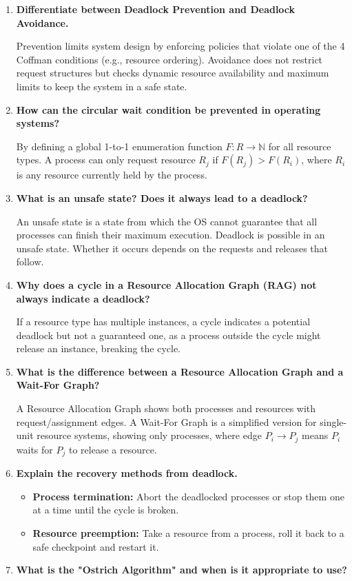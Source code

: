 \documentclass[12pt,a4paper]{article}
\newcommand{\Q}[1]{\textbf{#1}\par\noindent\ignorespaces}
\begin{document}
\begin{tcolorbox}[exambox, title={\textbf{Frequently Asked / Viva Questions}}]
\begin{enumerate}[topsep=0pt, label=\textbf{Q\arabic*.}, itemsep=5pt]
\begin{itemize}[leftmargin=*, itemsep=2.5pt, topsep=2pt]
    \end{itemize}
    \textbf{Result:} All processes finished. System is in \textbf{safe state} with safe sequence: $\langle \mathbf{P1, P3, P0, P2, P4} \rangle$.
  \item \Q{Differentiate between Deadlock Prevention and Deadlock Avoidance.}
    Prevention limits system design by enforcing policies that violate one of the 4 Coffman conditions (e.g., resource ordering). Avoidance does not restrict request structures but checks dynamic resource availability and maximum limits to keep the system in a safe state.
  \item \Q{How can the circular wait condition be prevented in operating systems?}
    By defining a global 1-to-1 enumeration function $F: R \to \mathbb{N}$ for all resource types. A process can only request resource $R_j$ if $F(R_j) > F(R_i)$, where $R_i$ is any resource currently held by the process.
  \item \Q{What is an unsafe state? Does it always lead to a deadlock?}
    An unsafe state is a state from which the OS cannot guarantee that all processes can finish their maximum execution. Deadlock is possible in an unsafe state. Whether it occurs depends on the requests and releases that follow.
  \item \Q{Why does a cycle in a Resource Allocation Graph (RAG) not always indicate a deadlock?}
    If a resource type has multiple instances, a cycle indicates a potential deadlock but not a guaranteed one, as a process outside the cycle might release an instance, breaking the cycle.
  \item \Q{What is the difference between a Resource Allocation Graph and a Wait-For Graph?}
    A Resource Allocation Graph shows both processes and resources with request/assignment edges. A Wait-For Graph is a simplified version for single-unit resource systems, showing only processes, where edge $P_i \to P_j$ means $P_i$ waits for $P_j$ to release a resource.
  \item \Q{Explain the recovery methods from deadlock.}
    \begin{itemize}[leftmargin=*, itemsep=2pt, topsep=2pt]
      \item \textbf{Process termination:} Abort the deadlocked processes or stop them one at a time until the cycle is broken.
      \item \textbf{Resource preemption:} Take a resource from a process, roll it back to a safe checkpoint and restart it.
    \end{itemize}
  \item \Q{What is the "Ostrich Algorithm" and when is it appropriate to use?}

\end{enumerate}
\end{tcolorbox}
\end{document}
